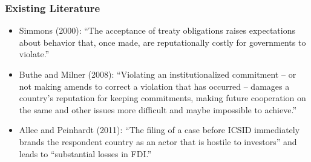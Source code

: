 \documentclass[10pt]{beamer}
\begin{document}
\begin{frame}
\frametitle{Existing Literature}

\begin{itemize}
	\item Simmons (2000): ``The acceptance of treaty obligations raises expectations about behavior that, once made, are reputationally costly for governments to violate.'' 
	\item Buthe and Milner (2008): ``Violating an institutionalized commitment -- or not making amends to correct a violation that has occurred -- damages a country's reputation for keeping commitments, making future cooperation on the same and other issues more difficult and maybe impossible to achieve.'' 
	\item Allee and Peinhardt (2011): ``The filing of a case before ICSID immediately brands the respondent country as an actor that is hostile to investors'' and leads to ``substantial losses in FDI.''
\end{itemize}



\end{frame}
\end{document}
